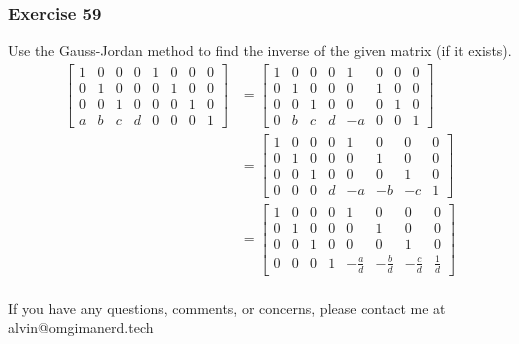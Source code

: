 \documentclass{math}
\begin{document}
\subsubsection*{Exercise 59}
Use the Gauss-Jordan method to find the inverse of the given matrix (if it
exists).
\begin{align*}
  \begin{bmatrix}
    1 & 0 & 0 & 0 & 1 & 0 & 0 & 0 \\
    0 & 1 & 0 & 0 & 0 & 1 & 0 & 0 \\
    0 & 0 & 1 & 0 & 0 & 0 & 1 & 0 \\
    a & b & c & d & 0 & 0 & 0 & 1
  \end{bmatrix} &= \begin{bmatrix}
    1 & 0 & 0 & 0 & 1 & 0 & 0 & 0 \\
    0 & 1 & 0 & 0 & 0 & 1 & 0 & 0 \\
    0 & 0 & 1 & 0 & 0 & 0 & 1 & 0 \\
    0 & b & c & d & -a & 0 & 0 & 1
  \end{bmatrix} \\
  &= \begin{bmatrix}
    1 & 0 & 0 & 0 & 1 & 0 & 0 & 0 \\
    0 & 1 & 0 & 0 & 0 & 1 & 0 & 0 \\
    0 & 0 & 1 & 0 & 0 & 0 & 1 & 0 \\
    0 & 0 & 0 & d & -a & -b & -c & 1
  \end{bmatrix} \\
  &= \begin{bmatrix}
    1 & 0 & 0 & 0 & 1 & 0 & 0 & 0 \\
    0 & 1 & 0 & 0 & 0 & 1 & 0 & 0 \\
    0 & 0 & 1 & 0 & 0 & 0 & 1 & 0 \\
    0 & 0 & 0 & 1 & -\frac{a}{d} & -\frac{b}{d} & -\frac{c}{d} & \frac{1}{d}
  \end{bmatrix} \\
\end{align*}

\begin{center}
  If you have any questions, comments, or concerns, please contact me at
  alvin@omgimanerd.tech
\end{center}
\end{document}
